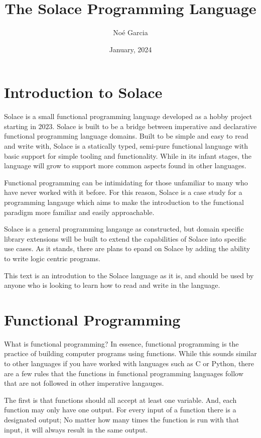\documentclass{article}
\title{
	\vspace{2in}
	\textmd{\textbf{The Solace Programming Language}}
	\vspace{3in}
}
\author{No\'e Garcia}
\date{January, 2024}
\begin{document}
\maketitle
\newpage

\section{Introduction to Solace}

Solace is a small functional programming language developed as a hobby project starting in
$2023$. Solace is built to be a bridge between imperative and  declarative functional programming
language domains. Built to be simple and easy to read and write with, Solace is a statically typed,
semi-pure functional language with basic support for simple tooling and functionality. While in
its infant stages, the language will grow to support more common aspects found in other
languages.

Functional programming can be intimidating for those unfamiliar to many who have never worked
with it before. For this reason, Solace is a case study for a programming langauge which aims to
make the introduction to the functional paradigm more familiar and easily approachable.

Solace is a general programming langauge as constructed, but domain specific library extensions
will be built to extend the capabilities of Solace into specific use cases. As it stands, there are
plans to epand on Solace by adding the ability to write logic centric programs.

This text is an introdution to the Solace language as it is, and should be used by anyone who is looking
to learn how to read and write in the language.


\section{Functional Programming}

What is functional programming? In essence, functional programming is the practice of building computer
programs using functions. While this sounds similar to other languages if you have worked with languages
such as C or Python, there are a few rules that the functions in functional programming languages follow
that are not followed in other imperative langauges.

The first is that functions should all accept at least one variable. And, each function may only have one
output. For every input of a function there is a designated output; No matter how many times the function is
run with that input, it will always result in the same output.
\end{document}
